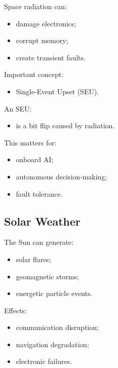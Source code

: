 \documentclass[10pt,a4paper,twocolumn]{article}
\begin{document}
Space radiation can:
\begin{itemize}
    \item damage electronics;
    \item corrupt memory;
    \item create transient faults.
\end{itemize}

Important concept:
\begin{itemize}
    \item Single-Event Upset (SEU).
\end{itemize}

An SEU:
\begin{itemize}
    \item is a bit flip caused by radiation.
\end{itemize}

This matters for:
\begin{itemize}
    \item onboard AI;
    \item autonomous decision-making;
    \item fault tolerance.
\end{itemize}


\subsection{Solar Weather}

The Sun can generate:
\begin{itemize}
    \item solar flares;
    \item geomagnetic storms;
    \item energetic particle events.
\end{itemize}

Effects:
\begin{itemize}
    \item communication disruption;
    \item navigation degradation;
    \item electronic failures.
\end{itemize}

\end{document}
